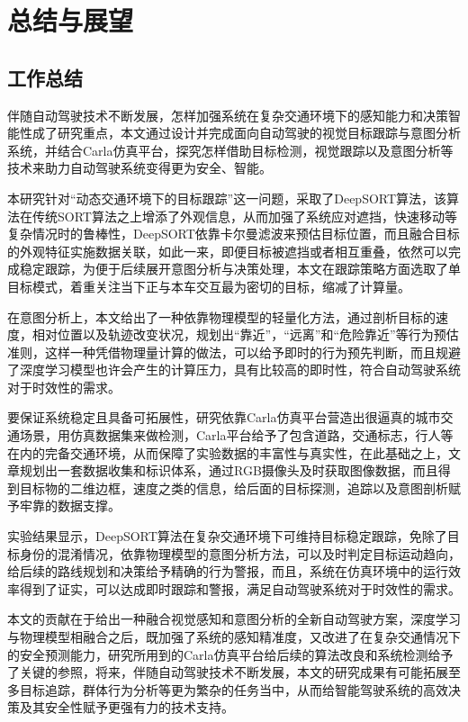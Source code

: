 \chapter{总结与展望}

\section{工作总结}

伴随自动驾驶技术不断发展，怎样加强系统在复杂交通环境下的感知能力和决策智能性成了研究重点，本文通过设计并完成面向自动驾驶的视觉目标跟踪与意图分析系统，并结合Carla仿真平台，探究怎样借助目标检测，视觉跟踪以及意图分析等技术来助力自动驾驶系统变得更为安全、智能。

本研究针对“动态交通环境下的目标跟踪”这一问题，采取了DeepSORT算法，该算法在传统SORT算法之上增添了外观信息，从而加强了系统应对遮挡，快速移动等复杂情况时的鲁棒性，DeepSORT依靠卡尔曼滤波来预估目标位置，而且融合目标的外观特征实施数据关联，如此一来，即便目标被遮挡或者相互重叠，依然可以完成稳定跟踪，为便于后续展开意图分析与决策处理，本文在跟踪策略方面选取了单目标模式，着重关注当下正与本车交互最为密切的目标，缩减了计算量。

在意图分析上，本文给出了一种依靠物理模型的轻量化方法，通过剖析目标的速度，相对位置以及轨迹改变状况，规划出“靠近”，“远离”和“危险靠近”等行为预估准则，这样一种凭借物理量计算的做法，可以给予即时的行为预先判断，而且规避了深度学习模型也许会产生的计算压力，具有比较高的即时性，符合自动驾驶系统对于时效性的需求。

要保证系统稳定且具备可拓展性，研究依靠Carla仿真平台营造出很逼真的城市交通场景，用仿真数据集来做检测，Carla平台给予了包含道路，交通标志，行人等在内的完备交通环境，从而保障了实验数据的丰富性与真实性，在此基础之上，文章规划出一套数据收集和标识体系，通过RGB摄像头及时获取图像数据，而且得到目标物的二维边框，速度之类的信息，给后面的目标探测，追踪以及意图剖析赋予牢靠的数据支撑。

实验结果显示，DeepSORT算法在复杂交通环境下可维持目标稳定跟踪，免除了目标身份的混淆情况，依靠物理模型的意图分析方法，可以及时判定目标运动趋向，给后续的路线规划和决策给予精确的行为警报，而且，系统在仿真环境中的运行效率得到了证实，可以达成即时跟踪和警报，满足自动驾驶系统对于时效性的需求。

本文的贡献在于给出一种融合视觉感知和意图分析的全新自动驾驶方案，深度学习与物理模型相融合之后，既加强了系统的感知精准度，又改进了在复杂交通情况下的安全预测能力，研究所用到的Carla仿真平台给后续的算法改良和系统检测给予了关键的参照，将来，伴随自动驾驶技术不断发展，本文的研究成果有可能拓展至多目标追踪，群体行为分析等更为繁杂的任务当中，从而给智能驾驶系统的高效决策及其安全性赋予更强有力的技术支持。



